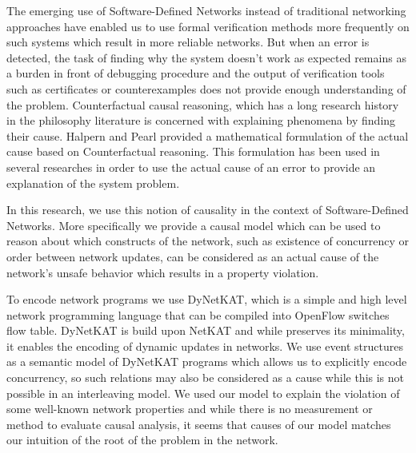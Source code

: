 The emerging use of Software-Defined Networks instead of 
traditional networking approaches have enabled us to 
use formal verification methods more frequently on such 
systems which result in more reliable networks.
But when an error is detected, the task of finding why  
the system doesn't work as expected remains as a burden 
in front of debugging procedure and the output of 
verification tools such as certificates or counterexamples
does not provide enough understanding of the problem.
Counterfactual causal reasoning, which has a long research
history in the philosophy literature is concerned with 
explaining phenomena by finding their cause.
Halpern and Pearl provided a mathematical formulation of 
the actual cause based on Counterfactual reasoning.
This formulation has been used in several researches in 
order to use the actual cause of an error to provide 
an explanation of the system problem.

In this research, we use this notion of causality in the 
context of Software-Defined Networks. 
More specifically we provide a causal model which can be used
to reason about which constructs of the network, such as 
existence of concurrency or order between network updates, can
be considered as an actual cause of the network's unsafe behavior
which results in a property violation.

To encode network programs we use DyNetKAT, which is a simple and high level network programming language that can be compiled into
OpenFlow switches flow table. DyNetKAT is build upon NetKAT and
while preserves its minimality, it enables the encoding of 
dynamic updates in networks. We use event structures as a semantic
model of DyNetKAT programs which allows us to explicitly encode 
concurrency, so such relations may also be considered as a cause
while this is not possible in an interleaving model. 
We used our model to explain the violation of some well-known 
network properties and while there is no measurement or method to 
evaluate causal analysis, it seems that causes of our model
matches our intuition of the root of the problem in the network.

